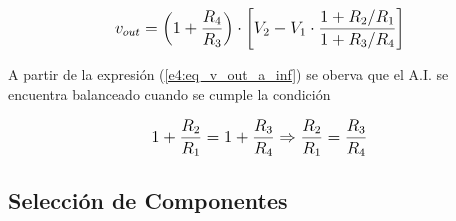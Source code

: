 \begin{equation}
\mathlarger{
v_{out} = \left(1 + \frac{R_4}{R_3}\right) \cdot \left[ V_2 - V_1 \cdot \frac{1+ R_2/R_1}{1+R_3/R_4} \right]
}
\label{e4:eq_v_out_a_inf}
\end{equation}

A partir de la expresión (\ref{e4:eq_v_out_a_inf}) se oberva que el A.I. se encuentra balanceado cuando se cumple la condición

\begin{equation*}
\mathlarger{
1+\frac{R_2}{R_1} = 1+\frac{R_3}{R_4} \Rightarrow \frac{R_2}{R_1} = \frac{R_3}{R_4}
}
\end{equation*}

\subsection{Selección de Componentes}
